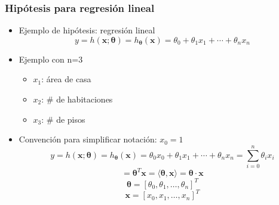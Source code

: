 \documentclass[spanish]{beamer}
\begin{document}

\begin{frame}
\frametitle{Hipótesis para regresión lineal}
\begin{itemize}
\item Ejemplo de hipótesis: regresión lineal 
\begin{equation*}
y=h(\mathbf{x}; \boldsymbol{\theta})= h_{\boldsymbol{\theta}}(\mathbf{x})= \theta_0+\theta_1x_1+\cdots + \theta_n x_n
\end{equation*}
\item Ejemplo con n=3 
\begin{itemize}
\item $x_{1}$: área de casa 
\item $x_{2}$: \# de habitaciones 
\item $x_{3}$: \# de pisos 
\end{itemize} 
\item Convención para simplificar notación: $x_0={1}$
\begin{equation*}
y=h(\mathbf{x}; \boldsymbol{\theta})= h_{\boldsymbol{\theta}}(\mathbf{x})= \theta_0x_0+\theta_1x_1+\cdots + \theta_n x_n=\sum_{i=0}^{n}{\theta_{i}x_{i}}
\end{equation*} 
\begin{equation*}
=\boldsymbol{\theta}^T  \mathbf{x}= \langle \boldsymbol{\theta},  \mathbf{x} \rangle= \boldsymbol{\theta} \cdot{}  \mathbf{x}
\end{equation*}
\begin{equation*}
\boldsymbol{\theta} = [\theta_{0},\theta_{1}, \ldots ,\theta_{n}]^T
\end{equation*}  
\begin{equation*}
\boldsymbol{x} = [x_{0},x_{1}, \ldots ,x_{n}]^T
\end{equation*}  
\end{itemize}


\end{frame}

\end{document}
